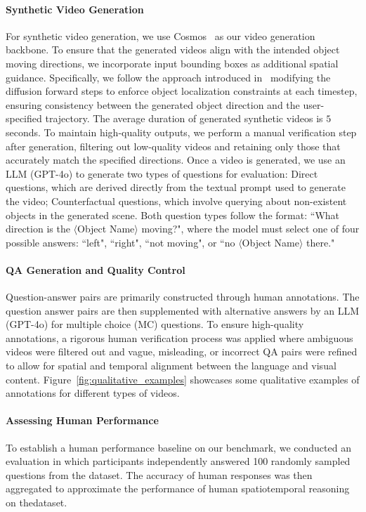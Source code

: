 \paragraph{Synthetic Video Generation}  
For synthetic video generation, we use Cosmos~\cite{agarwal2025cosmos} as our video generation backbone. To ensure that the generated videos align with the intended object moving directions, we incorporate input bounding boxes as additional spatial guidance. Specifically, we follow the approach introduced in~\cite{he2024mojito} modifying the diffusion forward steps to enforce object localization constraints at each timestep, ensuring consistency between the generated object direction and the user-specified trajectory. The average duration of generated synthetic videos is $5$ seconds. To maintain high-quality outputs, we perform a manual verification step after generation, filtering out low-quality videos and retaining only those that accurately match the specified directions. Once a video is generated, we use an LLM (GPT-4o) to generate two types of questions for evaluation: Direct questions, which are derived directly from the textual prompt used to generate the video; Counterfactual questions, which involve querying about non-existent objects in the generated scene. Both question types follow the format: ``What direction is the $\langle$Object Name$\rangle$ moving?", where the model must select one of four possible answers: ``left", ``right", ``not moving", or ``no $\langle$Object Name$\rangle$ there." 


\paragraph{QA Generation and Quality Control} Question-answer pairs are primarily constructed through human annotations. The question answer pairs are then supplemented with alternative answers by an LLM (GPT-4o) for multiple choice (MC) questions. To ensure high-quality annotations, a rigorous human verification process was applied where ambiguous videos were filtered out and vague, misleading, or incorrect QA pairs were refined to allow for spatial and temporal alignment between the language and visual content. Figure~\ref{fig:qualitative_examples} showcases some qualitative examples of annotations for different types of videos.

\paragraph{Assessing Human Performance}
To establish a human performance baseline on our benchmark, we conducted an evaluation in which participants independently answered 100 randomly sampled questions from the dataset. The accuracy of human responses was then aggregated to approximate the performance of human spatiotemporal reasoning on thedataset. 

